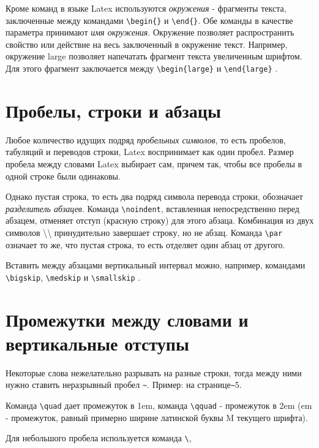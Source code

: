 Кроме команд в языке Latex используются {\it окружения} - фрагменты текста, заключенные между командами \verb|\begin{}| и \verb|\end{}|. Обе команды в качестве параметра принимают {\it имя окружения}. Окружение позволяет распространить свойство или действие на весь заключенный в окружение текст. Например, окружение large позволяет напечатать фрагмент текста увеличенным шрифтом. Для этого фрагмент заключается между \verb|\begin{large}| и \verb|\end{large}| \cite[][с.~14]{__2010}.

\section{Пробелы, строки и абзацы}
Любое количество идущих подряд {\it пробельных символов}, то есть пробелов, табуляций и переводов строки, Latex воспринимает как один пробел. Размер пробела между словами Latex выбирает сам, причем так, чтобы все пробелы в одной строке были одинаковы.

Однако пустая строка, то есть два подряд символа перевода строки, обозначает {\it разделитель абзацев}. Команда \verb|\noindent|, вставленная непосредственно перед абзацем, отменяет отступ (красную строку) для этого абзаца. Комбинация из двух символов  \textbackslash\textbackslash{} принудительно завершает строку, но не  абзац. Команда \verb|\par| означает то же, что пустая строка, то есть отделяет один абзац от другого.

Вставить между абзацами вертикальный интервал  можно, например, командами \verb|\bigskip|, \verb|\medskip| и \verb|\smallskip| \cite[][с.~14]{__2010} .

\section{Промежутки между словами и вертикальные отступы}

Некоторые слова нежелательно разрывать на разные строки, тогда между ними нужно ставить неразрывный пробел \verb|~|. Пример: на странице\verb|~|5.

Команда \verb|\quad| дает промежуток в 1em,  команда \verb|\qquad| - промежуток в 2em (em - промежуток, равный примерно ширине латинской буквы M текущего шрифта).

Для небольшого пробела используется команда \verb|\|,


